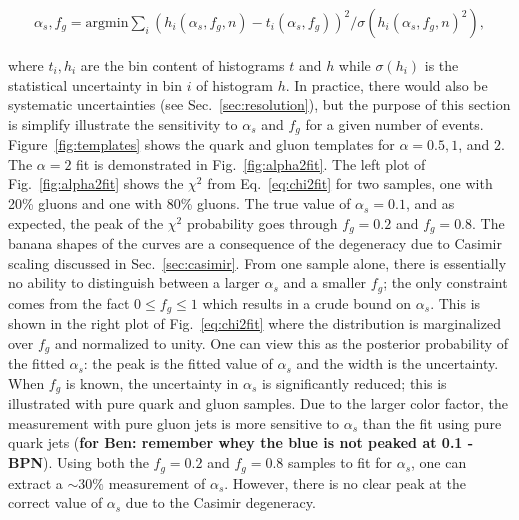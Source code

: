 \begin{align}
\label{eq:chi2fit}
\alpha_s,f_g=\text{argmin} \sum_i (h_i(\alpha_s,f_g,n)-t_i(\alpha_s,f_g))^2/\sigma(h_i(\alpha_s,f_g,n)^2),
\end{align}

\noindent where $t_i, h_i$ are the bin content of histograms $t$ and $h$ while $\sigma(h_i)$ is the statistical uncertainty in bin $i$ of histogram $h$.  In practice, there would also be systematic uncertainties (see Sec.~\ref{sec:resolution}), but the purpose of this section is simplify illustrate the sensitivity to $\alpha_s$ and $f_g$ for a given number of events.  Figure~\ref{fig:templates} shows the quark and gluon templates for $\alpha=0.5, 1$, and $2$.  The $\alpha=2$ fit is demonstrated in Fig.~\ref{fig:alpha2fit}.  The left plot of Fig.~\ref{fig:alpha2fit} shows the $\chi^2$ from Eq.~\ref{eq:chi2fit} for two samples, one with 20\% gluons and one with 80\% gluons.  The true value of $\alpha_s=0.1$, and as expected, the peak of the $\chi^2$ probability goes through $f_g=0.2$ and $f_g=0.8$.  The banana shapes of the curves are a consequence of the degeneracy due to Casimir scaling discussed in Sec.~\ref{sec:casimir}.  From one sample alone, there is essentially no ability to distinguish between a larger $\alpha_s$ and a smaller $f_g$; the only constraint comes from the fact $0\leq f_g\leq 1$ which results in a crude bound on $\alpha_s$.  This is shown in the right plot of Fig.~\ref{eq:chi2fit} where the distribution is marginalized over $f_g$ and normalized to unity.  One can view this as the posterior probability of the fitted $\alpha_s$: the peak is the fitted value of $\alpha_s$ and the width is the uncertainty.  When $f_g$ is known, the uncertainty in $\alpha_s$ is significantly reduced; this is illustrated with pure quark and gluon samples.  Due to the larger color factor, the measurement with pure gluon jets is more sensitive to $\alpha_s$ than the fit using pure quark jets (\textbf{for Ben: remember whey the blue is not peaked at 0.1 -BPN}).  Using both the $f_g=0.2$ and $f_g=0.8$ samples to fit for $\alpha_s$, one can extract a $\sim 30\%$ measurement of $\alpha_s$.  However, there is no clear peak at the correct value of $\alpha_s$ due to the Casimir degeneracy.  

